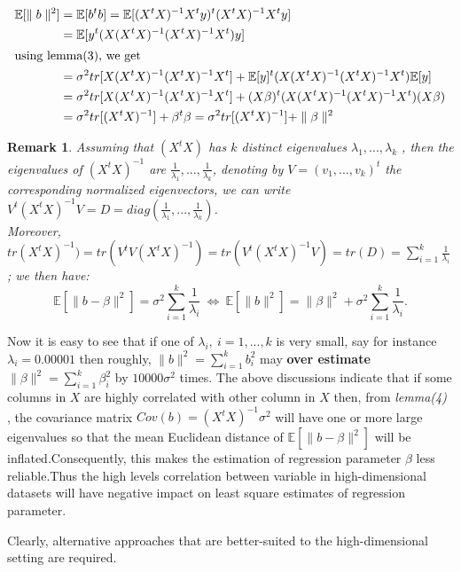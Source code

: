 \documentclass[12pt]{report}
\newtheorem{remarque}{Remark}[section]
\begin{document}
\begin{description}
{			\begin{align*}
				\mathbb{E}[\parallel b \parallel^{2}] & =\mathbb{E}[ b^{t}b] = \mathbb{E}[(X^{t}X)^{-1}X^{t}y)^{t}(X^{t}X)^{-1}X^{t}y] \\
				& =\mathbb{E}[ y^{t}(X(X^{t}X)^{-1}(X^{t}X)^{-1}X^{t})y] \\
				\intertext{using lemma(3), we get}
				& = \sigma^{2}tr[X(X^{t}X)^{-1}(X^{t}X)^{-1}X^{t}] + \mathbb{E}[y]^{t}(X(X^{t}X)^{-1}(X^{t}X)^{-1}X^{t})\mathbb{E}[y] \\
				& =  \sigma^{2}tr[X(X^{t}X)^{-1}(X^{t}X)^{-1}X^{t}] + (X\beta)^{t}(X(X^{t}X)^{-1}(X^{t}X)^{-1}X^{t})(X\beta) \\
				&=\sigma^{2}tr[(X^{t}X)^{-1}] + \beta^{t}\beta = \sigma^{2}tr[(X^{t}X)^{-1}] + \parallel \beta \parallel^{2}
			\end{align*}
		}
		\begin{remarque}
			Assuming that $(X^{t}X)$ has $k$ distinct eigenvalues $\lambda_{1},...,\lambda_{k}$ , then the eigenvalues of $(X^{t}X)^{-1}$ are $\frac{1}{\lambda_{1}},...,\frac{1}{\lambda_{k}}$, denoting by $ V=(v_{1},...,v_{k})^{t}$ the corresponding normalized eigenvectors, we can write $V^{t}(X^{t}X)^{-1}V=D=diag(\frac{1}{\lambda_{1}},...,\frac{1}{\lambda_{k}})$.\\ Moreover, $tr(X^{t}X)^{-1})=tr(V^{t}V(X^{t}X)^{-1})=tr(V^{t}(X^{t}X)^{-1}V)=tr(D)=\sum_{i=1}^{k}\frac{1}{\lambda_{i}}$ ; we then have:
			\begin{equation}
				\mathbb{E}[\parallel b-\beta \parallel^{2}]=\sigma^{2}\sum_{i=1}^{k}\frac{1}{\lambda_{i}}\  \Leftrightarrow\ \mathbb{E}[\parallel b \parallel^{2}]=\parallel \beta \parallel^{2} + \sigma^{2}\sum_{i=1}^{k}\frac{1}{\lambda_{i}}.
				\label{f9}
			\end{equation}	
		\end{remarque}
		
		Now it is easy to see that if one of $\lambda_{i} ,\ i=1,...,k$ is very small, say for instance $\lambda_{i}=0.00001$ then roughly, $\parallel b \parallel^{2}=\sum_{i=1}^{k}b_{i}^{2}$ may \textbf{over estimate} $\parallel \beta \parallel^{2}=\sum_{i=1}^{k}\beta_{i}^{2}$ by $10000\sigma^{2}$ times.\newline
		The above discussions indicate that if some columns in $X$ are highly correlated with other column in $X$ then, from \textit{lemma(4)} , the covariance matrix $Cov(b)=(X^{t}X)^{-1}\sigma^{2}$ will have one or more large eigenvalues so that the mean Euclidean distance of $\mathbb{E}[\parallel b-\beta \parallel^{2}]$ will be inflated.Consequently, this makes the estimation of regression parameter $\beta$ less reliable.Thus the high levels correlation between variable in high-dimensional datasets will have negative impact on least square estimates of regression parameter.
		
		Clearly, alternative approaches that are better-suited to the high-dimensional setting are required.
	\end{description}
\end{document}
